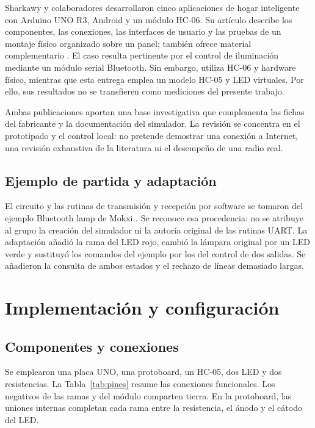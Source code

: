 \documentclass[10pt,a4paper,conference]{IEEEtran}
\begin{document}
Sharkawy y colaboradores desarrollaron cinco aplicaciones de hogar inteligente con Arduino UNO R3, Android y un módulo HC-06. Su artículo describe los componentes, las conexiones, las interfaces de usuario y las pruebas de un montaje físico organizado sobre un panel; también ofrece material complementario \cite{sharkawy}. El caso resulta pertinente por el control de iluminación mediante un módulo serial Bluetooth. Sin embargo, utiliza HC-06 y hardware físico, mientras que esta entrega emplea un modelo HC-05 y LED virtuales. Por ello, sus resultados no se transfieren como mediciones del presente trabajo.

Ambas publicaciones aportan una base investigativa que complementa las fichas del fabricante y la documentación del simulador. La revisión se concentra en el prototipado y el control local: no pretende demostrar una conexión a Internet, una revisión exhaustiva de la literatura ni el desempeño de una radio real.

\subsection{Ejemplo de partida y adaptación}
El circuito y las rutinas de transmisión y recepción por software se tomaron del ejemplo Bluetooth lamp de Mokxi \cite{ejemplo}. Se reconoce esa procedencia: no se atribuye al grupo la creación del simulador ni la autoría original de las rutinas UART. La adaptación añadió la rama del LED rojo, cambió la lámpara original por un LED verde y sustituyó los comandos del ejemplo por los del control de dos salidas. Se añadieron la consulta de ambos estados y el rechazo de líneas demasiado largas.

\section{Implementación y configuración}
\subsection{Componentes y conexiones}
Se emplearon una placa UNO, una protoboard, un HC-05, dos LED y dos resistencias. La Tabla~\ref{tab:pines} resume las conexiones funcionales. Los negativos de las ramas y del módulo comparten tierra. En la protoboard, las uniones internas completan cada rama entre la resistencia, el ánodo y el cátodo del LED.
\end{document}
